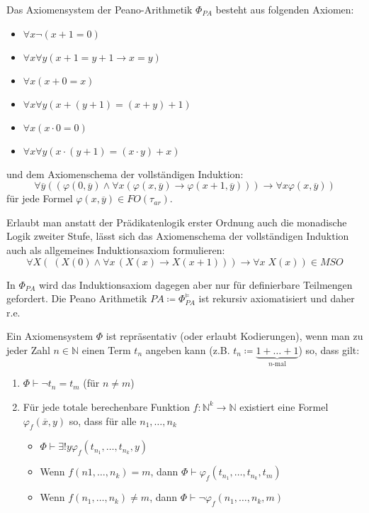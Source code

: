 Das Axiomensystem der Peano-Arithmetik $\Phi_{PA}$ besteht aus folgenden Axiomen:
\begin{itemize}
	\item $\forall x \neg(x+1=0)$
	\item $\forall x \forall y (x+1=y+1\rightarrow x=y)$
	\item $\forall x (x+0=x)$
	\item $\forall x \forall y(x+(y+1)=(x+y)+1)$
	\item $\forall x (x\cdot 0=0)$
	\item $\forall x \forall y (x\cdot(y+1) = (x\cdot y)+x)$
\end{itemize}
und dem Axiomenschema der vollständigen Induktion: 
$$ \forall \overline{y} ( (\varphi(0,\overline{y}) \land   \forall x 
(\varphi(x,\overline{y})\rightarrow\varphi(x+1,\overline{y}))   ) 
\rightarrow \forall x \varphi(x,\overline{y})) $$
für jede Formel $\varphi(x,\overline{y})\in FO(\tau_{ar})$.

Erlaubt man anstatt der Prädikatenlogik erster Ordnung auch die monadische Logik zweiter Stufe, lässt sich das Axiomenschema der vollständigen Induktion auch als allgemeines Induktionsaxiom formulieren:
$$ \forall X  (\;(X(0) \land \forall x\,(X(x)\rightarrow X(x+1)) ) 
\rightarrow \forall x\; X(x))\in MSO$$

In $\Phi_{PA}$ wird das Induktionsaxiom dagegen aber nur für definierbare Teilmengen gefordert. Die Peano Arithmetik $PA\coloneqq \Phi_{PA}^{\models}$ ist rekursiv axiomatisiert und daher r.e.

\begin{definition}
	Ein Axiomensystem $\Phi$ ist repräsentativ (oder erlaubt Kodierungen), wenn man zu jeder Zahl $n\in \mathbb{N}$ einen Term $t_n$ angeben kann (z.B. $t_n\coloneqq\underbrace{1+\dots+1}_{n\text{-mal}}$) so, dass gilt:
	\begin{enumerate}
		\item $\Phi\vdash \neg t_n=t_m$ (für $n\neq m$)
		\item Für jede totale berechenbare Funktion $f:\mathbb{N}^k\to\mathbb{N}$ existiert eine Formel $\varphi_f(\overline{x}, y)$ so, dass für alle $n_1,\dots,n_k$
		\begin{itemize}
			\item $\Phi\vdash \exists!y \varphi_f(t_{n_1},\dots,t_{n_k}, y)$
			\item Wenn $f(n1,\dots,n_k)=m$, dann $\Phi\vdash\varphi_f(t_{n_1},\dots,t_{n_k},t_m)$
			\item Wenn $f(n_1,\dots,n_k)\neq m$, dann $\Phi\vdash\neg\varphi_f(n_1,\dots,n_k,m)$
		\end{itemize}
	\end{enumerate}	
\end{definition}

